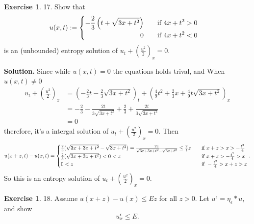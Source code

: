 \documentclass[a4paper]{book}
\newenvironment{solution}%
{\noindent\textbf{Solution.}}%
{\qedhere}
\numberwithin{equation}{chapter}
\theoremstyle{definition}
\newtheorem{exc}[exm]{Exercise}
\begin{document}
\begin{exc}
  17.  Show that
  \begin{equation*}
    u(x,t) :=
    \begin{cases}
      \begin{aligned}
      - \frac{2}{3}\left( t + \sqrt{3x + t^2} \right)& \qquad \textmd{if } 4x + t^2 > 0 \\
      0& \qquad \textmd{if } 4x + t^2 < 0
      \end{aligned}
    \end{cases}
  \end{equation*}
  is an (unbounded) entropy solution of $u_t + (\frac{u^2}{2})_x = 0$.
\end{exc}

\begin{solution}
  Since while $u(x,t) = 0$ the equations holds trival, and When $u(x,t) \not= 0$ 
  \begin{align*}
    u_t + \left( \frac{u^2}{2} \right)_x &= (-\frac{2}{3}t - \frac{2}{3}\sqrt{3x + t^2})_t + \left( \frac{4 }{9}t^2 + \frac{2}{3}x + \frac{4}{9}t\sqrt{3x + t^2} \right)_x \\
                                         &= - \frac{2}{3} - \frac{2t}{3\sqrt{3x + t^2}} + \frac{2}{3} + \frac{2t}{3\sqrt{3x + t^2}}\\
    &= 0
  \end{align*}
  therefore, it's a intergal solution of $u_t + (\frac{u^2}{2})_x = 0$. Then
  \begin{align*}
    u(x + z, t) - u(x,t) =
    \begin{cases}
      \frac{2}{3}(\sqrt{3x + 3z + t^2} - \sqrt{3x + t^2} ) =\frac{2z}{\sqrt{3x + 3z + t^2} - \sqrt{3x + t^2}} \leq \frac{2}{t}z \quad &\textmd{if } x+z > x > -\frac{t^2}{4}  \\
      \frac{2}{3}(\sqrt{3x + 3z + t^2}) < 0 < z \quad &\textmd{if } x+z > -\frac{t^2}{4} > x \\
      0 < z \quad &\textmd{if } -\frac{t^2}{4} > x+z > x
    \end{cases}.
  \end{align*}
  So this is an entropy solution of $u_t + (\frac{u^2}{2})_x = 0$.
\end{solution}


\begin{exc}
  18.  Assume $u(x + z) - u(x) \leq Ez$ for all $z > 0$. Let $u^{\epsilon} = \eta_\epsilon * u$, and show
  \[u_x^\epsilon \leq E.\]
\end{exc}
\end{document}
